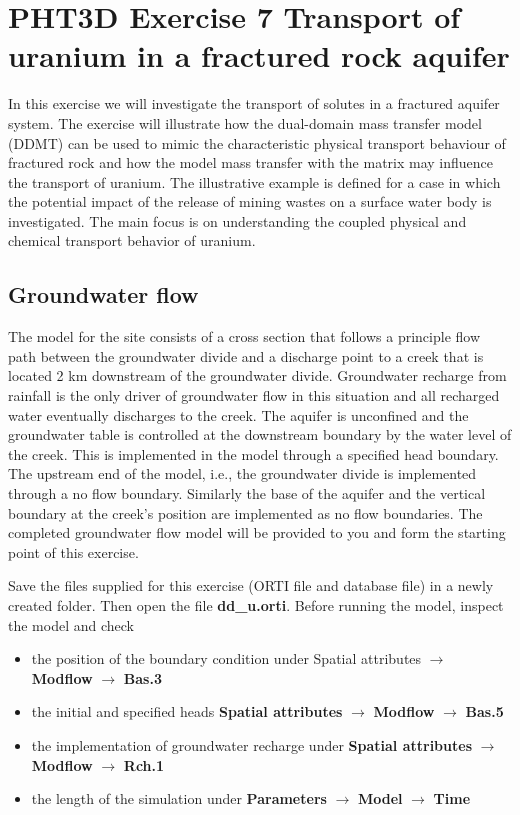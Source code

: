 \section[PHT3D Exercise 7 Transport of uranium in a fractured rock aquifer]{PHT3D Exercise 7 Transport of uranium in a fractured rock aquifer}

In this exercise we will investigate the transport of solutes 
in a fractured aquifer system. The exercise will illustrate 
how the dual-domain mass transfer model (DDMT) can be used to mimic the
characteristic physical transport behaviour of fractured rock
and how the model mass transfer with the matrix may influence 
the transport of uranium. The illustrative example
is defined for a case in which the potential impact of 
the release of mining wastes on a surface water body 
is investigated. The main focus is on understanding the 
coupled physical and chemical transport behavior of uranium.        

\subsection{Groundwater flow}

The model for the site consists of a cross section that follows 
a principle flow path between the groundwater divide and 
a discharge point to a creek that is located 2 km downstream of the 
groundwater divide. Groundwater recharge from rainfall is the only 
driver of groundwater flow in this situation and all recharged 
water eventually discharges to the creek. 
The aquifer is unconfined and the groundwater table 
is controlled at the downstream boundary by the water level of the creek.
This is implemented in the model through a specified head boundary. 
The upstream end of the model, i.e., the groundwater divide is implemented
through a no flow boundary. Similarly the base of the aquifer and the
vertical boundary at the creek's position are implemented 
as no flow boundaries. The completed groundwater flow model 
will be provided to you and form the starting point of this exercise.

Save the files supplied for this exercise 
(ORTI file and database file) in a newly created 
folder. Then open the file  {\color{red}\textbf{dd\_u.orti}}.
Before running the model, inspect the model and check
\begin{itemize}
\item the position of the boundary condition under 
{\color{blue}Spatial attributes} 
$\rightarrow$ {\color{blue}\textbf{Modflow}} 
$\rightarrow$ {\color{blue}\textbf{Bas.3}}
\item the initial and specified heads 
{\color{blue}\textbf{Spatial attributes}} 
$\rightarrow$ {\color{blue}\textbf{Modflow}} 
$\rightarrow$  {\color{blue}\textbf{Bas.5}}
\item the implementation of groundwater recharge under 
{\color{blue}\textbf{Spatial attributes}} 
$\rightarrow$ {\color{blue}\textbf{Modflow}} 
$\rightarrow$ {\color{blue}\textbf{Rch.1}}
\item the length of the simulation under 
{\color{blue}\textbf{Parameters}} 
$\rightarrow$ {\color{blue}\textbf{Model}}
$\rightarrow$ {\color{blue}\textbf{Time}}
\end{itemize}

